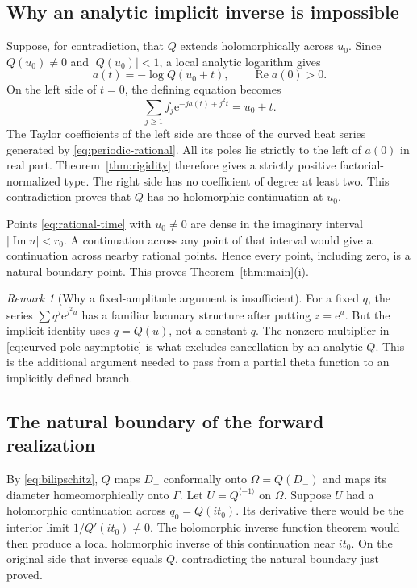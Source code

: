 \documentclass[11pt,a4paper]{article}
\numberwithin{equation}{section}
\theoremstyle{definition}
\theoremstyle{remark}
\newtheorem{remark}[theorem]{Remark}
\newcommand{\ee}{\mathrm e}
\newcommand{\Ree}{\operatorname{Re}}
\newcommand{\Imm}{\operatorname{Im}}
\newcommand{\inv}{\langle-1\rangle}
\begin{document}
\subsection{Why an analytic implicit inverse is impossible}
Suppose, for contradiction, that $Q$ extends holomorphically across $u_0$.
Since $Q(u_0)\ne0$ and $|Q(u_0)|<1$, a local analytic logarithm gives
\begin{equation}
 a(t)=-\log Q(u_0+t),\qquad \Ree a(0)>0.
 \label{eq:analytic-amplitude}
\end{equation}
On the left side of $t=0$, the defining equation becomes
\begin{equation}
 \sum_{j\ge1}f_j\ee^{-ja(t)+j^2t}=u_0+t.
 \label{eq:contradiction-identity}
\end{equation}
The Taylor coefficients of the left side are those of the curved heat
series generated by \eqref{eq:periodic-rational}.
All its poles lie strictly to the left of $a(0)$ in real part.
Theorem~\ref{thm:rigidity} therefore gives a strictly positive
factorial-normalized type.  The right side has no coefficient of degree
at least two.  This contradiction proves that $Q$ has no holomorphic
continuation at $u_0$.

Points \eqref{eq:rational-time} with $u_0\ne0$ are dense in the imaginary
interval $|\Imm u|<r_0$.  A continuation across any point of that interval
would give a continuation across nearby rational points.  Hence every
point, including zero, is a natural-boundary point.  This proves
Theorem~\ref{thm:main}(i).

\begin{remark}[Why a fixed-amplitude argument is insufficient]
For a fixed $q$, the series $\sum q^j\ee^{j^2u}$ has a familiar lacunary
structure after putting $z=\ee^u$.  But the implicit identity uses
$q=Q(u)$, not a constant $q$.  The nonzero multiplier in
\eqref{eq:curved-pole-asymptotic} is what excludes cancellation by an
analytic $Q$.  This is the additional argument needed to pass from a
partial theta function to an implicitly defined branch.
\end{remark}

\subsection{The natural boundary of the forward realization}
By \eqref{eq:bilipschitz}, $Q$ maps $D_-$ conformally onto
$\Omega=Q(D_-)$ and maps its diameter homeomorphically onto $\Gamma$.
Let $U=Q^{\inv}$ on $\Omega$.  Suppose $U$ had a holomorphic
continuation across $q_0=Q(it_0)$.
Its derivative there would be the interior limit
$1/Q'(it_0)\ne0$.  The holomorphic inverse function theorem would then
produce a local holomorphic inverse of this continuation near $it_0$.
On the original side that inverse equals $Q$, contradicting the natural
boundary just proved.
\end{document}
